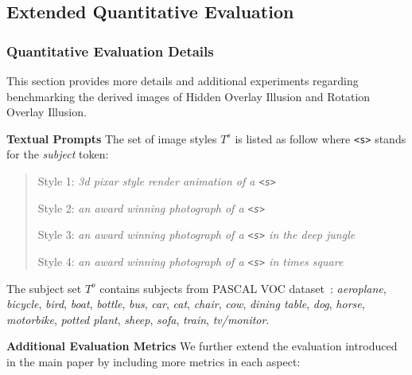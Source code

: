 \subsection{Extended Quantitative Evaluation}
\label{diffill_sec:more_eval}

\subsubsection{Quantitative Evaluation Details}
This section provides more details and additional experiments regarding benchmarking the derived images of Hidden Overlay Illusion and Rotation Overlay Illusion.

\noindent\textbf{Textual Prompts} \quad The set of image styles $T^s$ is listed as follow where \texttt{<s>} stands for the \textit{subject} token:

\begin{quote}
Style 1: \textit{3d pixar style render animation of a \texttt{<s>}}

Style 2: \textit{an award winning photograph of a \texttt{<s>}}

Style 3: \textit{an award winning photograph of a \texttt{<s>} in the deep jungle}

Style 4: \textit{an award winning photograph of a \texttt{<s>} in times square}
\end{quote}

The subject set $T^o$ contains subjects from PASCAL VOC dataset~\cite{everingham2010pascal}: \textit{aeroplane}, \textit{bicycle}, \textit{bird}, \textit{boat}, \textit{bottle}, \textit{bus}, \textit{car}, \textit{cat}, \textit{chair}, \textit{cow}, \textit{dining table}, \textit{dog}, \textit{horse}, \textit{motorbike}, \textit{potted plant}, \textit{sheep}, \textit{sofa}, \textit{train}, \textit{tv/monitor}.

\noindent\textbf{Additional Evaluation Metrics} \quad We further extend the evaluation introduced in the main paper by including more metrics in each aspect:

